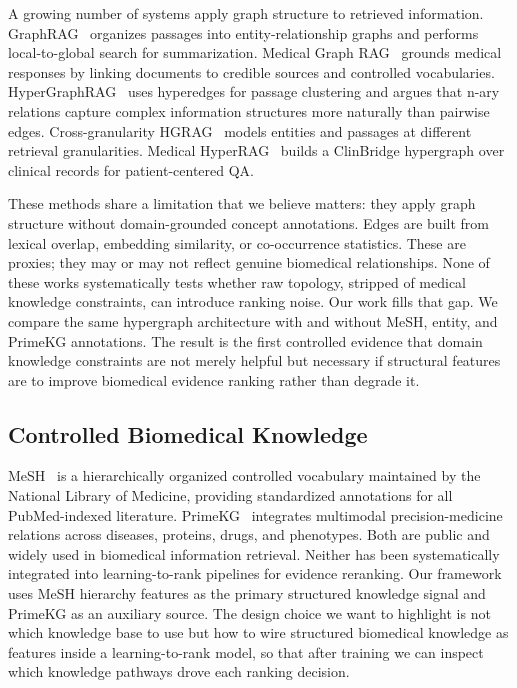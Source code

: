 A growing number of systems apply graph structure to retrieved information. GraphRAG~\citep{edge2024graphrag} organizes passages into entity-relationship graphs and performs local-to-global search for summarization. Medical Graph RAG~\citep{wu2024medgraphrag} grounds medical responses by linking documents to credible sources and controlled vocabularies. HyperGraphRAG~\citep{luo2025hypergraphrag} uses hyperedges for passage clustering and argues that n-ary relations capture complex information structures more naturally than pairwise edges. Cross-granularity HGRAG~\citep{wang2026hgrag} models entities and passages at different retrieval granularities. Medical HyperRAG~\citep{xu2026medicalhyperrag} builds a ClinBridge hypergraph over clinical records for patient-centered QA.

These methods share a limitation that we believe matters: they apply graph structure without domain-grounded concept annotations. Edges are built from lexical overlap, embedding similarity, or co-occurrence statistics. These are proxies; they may or may not reflect genuine biomedical relationships. None of these works systematically tests whether raw topology, stripped of medical knowledge constraints, can introduce ranking noise. Our work fills that gap. We compare the same hypergraph architecture with and without MeSH, entity, and PrimeKG annotations. The result is the first controlled evidence that domain knowledge constraints are not merely helpful but necessary if structural features are to improve biomedical evidence ranking rather than degrade it.

\subsection{Controlled Biomedical Knowledge}

MeSH~\citep{nlm2026mesh} is a hierarchically organized controlled vocabulary maintained by the National Library of Medicine, providing standardized annotations for all PubMed-indexed literature. PrimeKG~\citep{chandak2023primekg} integrates multimodal precision-medicine relations across diseases, proteins, drugs, and phenotypes. Both are public and widely used in biomedical information retrieval. Neither has been systematically integrated into learning-to-rank pipelines for evidence reranking. Our framework uses MeSH hierarchy features as the primary structured knowledge signal and PrimeKG as an auxiliary source. The design choice we want to highlight is not which knowledge base to use but how to wire structured biomedical knowledge as features inside a learning-to-rank model, so that after training we can inspect which knowledge pathways drove each ranking decision.
